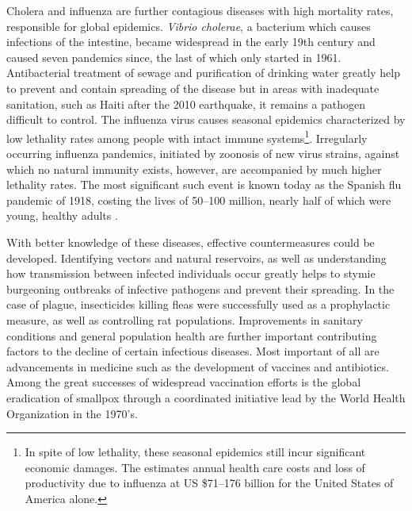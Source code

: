 Cholera and influenza are further contagious diseases with high mortality rates, responsible for global epidemics. \textit{Vibrio cholerae}, a bacterium which causes infections of the intestine, became widespread in the early 19th century and caused seven pandemics since, the last of which only started in 1961. Antibacterial treatment of sewage and purification of drinking water greatly help to prevent and contain spreading of the disease but in areas with inadequate sanitation, such as Haiti after the 2010 earthquake, it remains a pathogen difficult to control. The influenza virus causes seasonal epidemics characterized by low lethality rates among people with intact immune systems\footnote{In spite of low lethality, these seasonal epidemics still incur significant economic damages. The \cite{WHO2003} estimates annual health care costs and loss of productivity due to influenza at US \$71--176 billion for the United States of America alone.}. Irregularly occurring influenza pandemics, initiated by zoonosis of new virus strains, against which no natural immunity exists, however, are accompanied by much higher lethality rates. The most significant such event is known today as the Spanish flu pandemic of 1918, costing the lives of 50--100 million, nearly half of which were young, healthy adults \citep{Taubenberger2006}.

With better knowledge of these diseases, effective countermeasures could be developed. Identifying vectors and natural reservoirs, as well as understanding how transmission between infected individuals occur greatly helps to stymie burgeoning outbreaks of infective pathogens and prevent their spreading. In the case of plague, insecticides killing fleas were successfully used as a prophylactic measure, as well as controlling rat populations. Improvements in sanitary conditions and general population health are further important contributing factors to the decline of certain infectious diseases. Most important of all are advancements in medicine such as the development of vaccines and antibiotics. Among the great successes of widespread vaccination efforts is the global eradication of smallpox through a coordinated initiative lead by the World Health Organization in the 1970's.




